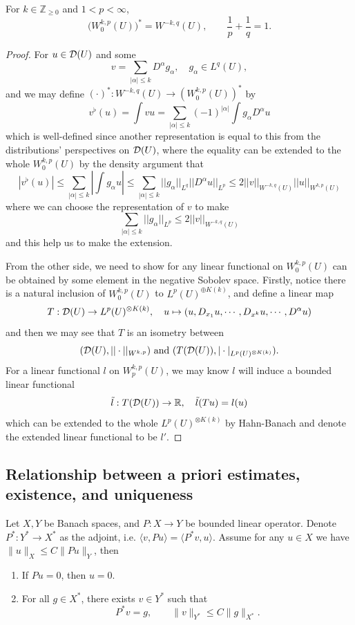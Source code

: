\begin{proposition}
For $k\in\mathbb{Z}_{\ge0}$ and $1<p<\infty$,
\[
\bigl(W^{k,p}_0(U)\bigr)^*
= W^{-k,q}(U),
\qquad
\frac1p+\frac1q=1.
\]
\end{proposition}
\begin{proof}
For $u\in \mathcal{D}(U)$ and some
\[
v = \sum\limits_{|\alpha| \leq k} D^{\alpha}g_{\alpha},\quad  g_{\alpha} \in L^q(U),
\]
and we may define $(\cdot)^*: W^{-k,q}(U) \to (W^{k,p}_0(U))^*$ by
\[
v^{\flat}(u) = \int vu = \sum\limits_{|\alpha| \leq k} (-1)^{|\alpha|}\int g_{\alpha} D^{\alpha}u
\]
which is well-defined since another representation is equal to this from the distributions' perspectives on $\mathcal{D}(U)$, where the equality can be extended to the whole $W^{k,p}_0(U)$ by the density argument that
\[
|v^{\flat}(u)| \leq \sum\limits_{|\alpha| \leq k}\left|\int g_{\alpha} u\right| \leq \sum\limits_{|\alpha| \leq k}||g_{\alpha}||_{L^q}||D^{\alpha}u||_{L^p} \leq 2||v||_{W^{-k,q}(U)} ||u||_{W^{k,p}(U)} 
\]
where we can choose the representation of $v$ to make
\[
\sum\limits_{|\alpha| \leq k}||g_{\alpha}||_{L^p} \leq 2||v||_{W^{-k,q}(U)}
\]
and this help us to make the extension.
\par
From the other side, we need to show for any linear functional on $W^{k,p}_0(U)$ can be obtained by some element in the negative Sobolev space. Firstly, notice there is a natural inclusion of $W_0^{k,p}(U)$ to $L^p(U)^{\oplus K(k)}$, and define a linear map
\[
T:\mathcal{D}(U) \to L^p(U)^{\otimes K(k)}, \quad u\mapsto (u,D_{x_1}u,\cdots, D_{x^{k}}u,\cdots,D^{\alpha}u)
\]
and then we may see that $T$ is an isometry between \[(\mathcal{D}(U),||\cdot||_{W^{k,p}}) \text{ and } (T(\mathcal{D}(U)),|\cdot|_{L^p(U)^{\otimes K(k)}}).\]
For a linear functional $l$ on $W^{k,p}_p(U)$, we may know $l$ will induce a bounded linear functional
\[
\tilde{l}: T(\mathcal{D}(U)) \to\mathbb{R},\quad \tilde{l}(Tu) = l(u)
\]
which can be extended to the whole $L^p(U)^{\otimes K(k)}$ by Hahn-Banach and denote the extended linear functional to be $l'$.

\end{proof}

\subsection{Relationship between a priori estimates, existence, and uniqueness}

\begin{proposition}
    Let $X,Y$ be Banach spaces, and $P:X\to Y \label{dop}$ be bounded linear operator. Denote $P^*:Y^*\to X^*$ as the adjoint, i.e. $\langle v,Pu\rangle
= \langle P^*v,u\rangle.$ Assume for any $u\in X$ we have $\|u\|_X\le C\|Pu\|_Y$, then
\begin{enumerate}
\item If $Pu=0$, then $u=0$.
\item For all $g\in X^*$,
there exists $v\in Y^*$
such that
\[
P^*v=g,
\qquad
\|v\|_{Y^*}\le C\|g\|_{X^*}.
\]
\end{enumerate}
\end{proposition}

